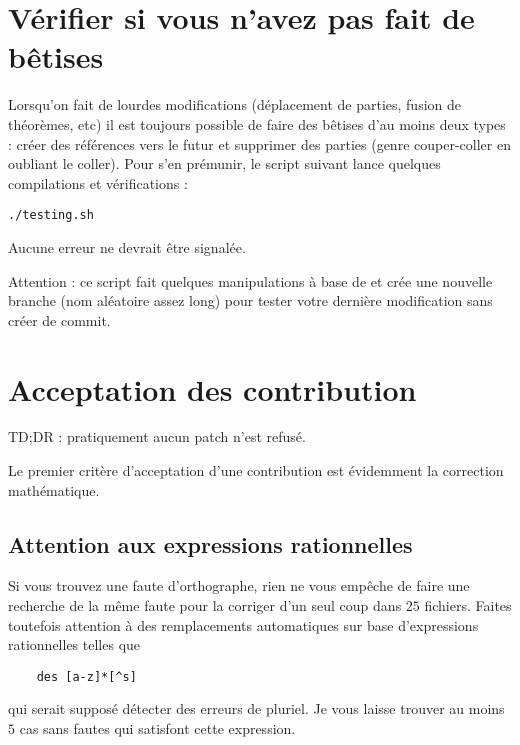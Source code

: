 \section{Vérifier si vous n'avez pas fait de bêtises}

Lorsqu'on fait de lourdes modifications (déplacement de parties, fusion de théorèmes, etc) il est toujours possible de faire des bêtises d'au moins deux types : créer des références vers le futur et supprimer des parties (genre couper-coller en oubliant le coller). Pour s'en prémunir, le script suivant lance quelques compilations et vérifications :

\begin{verbatim}
./testing.sh
\end{verbatim}
Aucune erreur ne devrait être signalée.

Attention : ce script fait quelques manipulations à base de  et crée une nouvelle branche (nom aléatoire assez long) pour tester votre dernière modification sans créer de commit.

\section{Acceptation des contribution}

TD;DR : pratiquement aucun patch n'est refusé.

Le premier critère d'acceptation d'une contribution est évidemment la correction mathématique.

\subsection{Attention aux expressions rationnelles}

Si vous trouvez une faute d'orthographe, rien ne vous empêche de faire une recherche de la même faute pour la corriger d'un seul coup dans \( 25\) fichiers. Faites toutefois attention à des remplacements automatiques sur base d'expressions rationnelles telles que
\begin{verbatim}
    des [a-z]*[^s]
\end{verbatim}
qui serait supposé détecter des erreurs de pluriel. Je vous laisse trouver au moins \( 5\) cas sans fautes qui satisfont cette expression.

